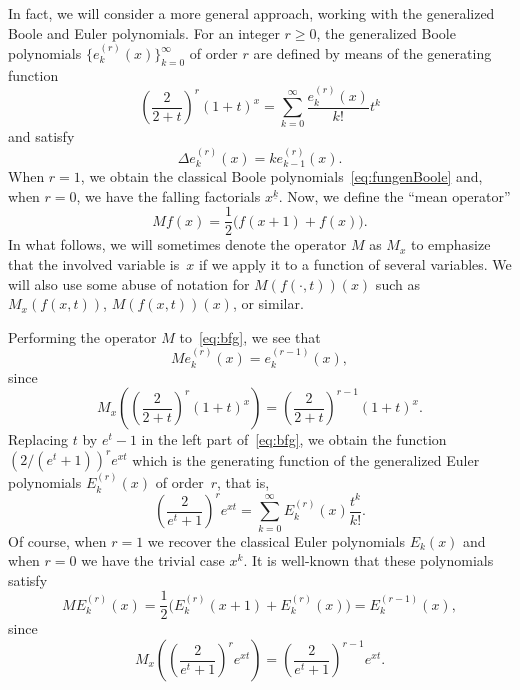 \documentclass[11pt]{article}
\theoremstyle{plain}
\theoremstyle{remark}
\numberwithin{equation}{section} %
\begin{document}

In fact, we will consider a more general approach, working with the generalized Boole and Euler polynomials. 
For an integer $r\ge 0$, the generalized Boole polynomials $\{e^{(r)}_k(x)\}_{k=0}^{\infty}$ of order $r$ are defined by means of the generating function
\begin{equation}
\label{eq:bfg}
  \left(\frac{2}{2+t}\right)^r (1+t)^x = \sum_{k=0}^{\infty} \frac{e^{(r)}_k(x)}{k!}t^k
\end{equation}
and satisfy
\begin{equation}
\label{eq:Delta-boole}
  \Delta e^{(r)}_k(x)=ke^{(r)}_{k-1}(x).
\end{equation}
When $r=1$, we obtain the classical Boole polynomials~\eqref{eq:fungenBoole} and, when $r=0$, we have the falling factorials $x^{\underline{k}}$.
Now, we define the ``mean operator''
\[
  Mf(x) = \frac{1}{2}\big(f(x+1)+f(x)\big).
\]
In what follows, we will sometimes denote the operator $M$ as $M_x$ to emphasize that the involved variable is~$x$ if we apply it to a function of several variables. We will also use some abuse of notation for $M(f(\cdot,t))(x)$ such as $M_x(f(x,t))$, $M(f(x,t))(x)$, or similar.

Performing the operator $M$ to~\eqref{eq:bfg}, we see that 
\begin{equation}
\label{eq:Me}
  Me^{(r)}_k(x) = e^{(r-1)}_k(x),
\end{equation}
since
\begin{equation}
\label{eq:Mfg}
  M_x\left(\left(\frac{2}{2+t}\right)^r(1+t)^x\right)
  = \left(\frac{2}{2+t}\right)^{r-1}(1+t)^x.
\end{equation}
Replacing $t$ by $e^t-1$ in the left part of~\eqref{eq:bfg}, we obtain the function $(2/(e^t+1))^re^{xt}$ which is the generating function of the generalized Euler polynomials $E^{(r)}_k(x)$ of order~$r$, that is,
\begin{equation}
\label{eq:Euler}
  \left(\frac{2}{e^t+1}\right)^r e^{xt} 
  = \sum_{k=0}^{\infty} E^{(r)}_k(x) \frac{t^k}{k!}.
\end{equation}
Of course, when $r=1$ we recover the classical Euler polynomials $E_k(x)$ and when $r=0$ we have the trivial case $x^k$. It is well-known that these polynomials satisfy
\begin{equation}
\label{eq:ME}
  M E^{(r)}_k(x) = \frac{1}{2}\big(E^{(r)}_k(x+1)+E^{(r)}_k(x)\big) = E_k^{(r-1)}(x),
\end{equation}
since
\begin{equation}
\label{eq:Mfg-c}
  M_x\left(\left(\frac{2}{e^t+1}\right)^re^{xt}\right)
  = \left(\frac{2}{e^t+1}\right)^{r-1}e^{xt}.
\end{equation}
\end{document}
